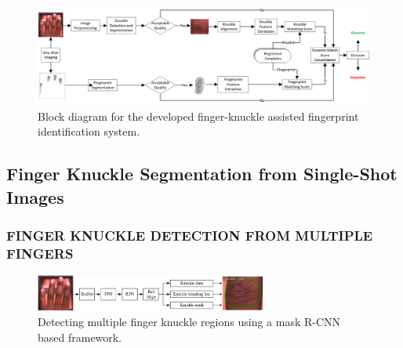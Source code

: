 \begin{figure}[!ht]
    \centering
    \includegraphics[width=6in]{Figures/block-diagram.png}
    \caption{Block diagram for the developed finger-knuckle assisted fingerprint identification system.}
    \label{block-diagram}
\end{figure}

\subsection{Finger Knuckle Segmentation from Single-Shot Images}
\subsubsection{FINGER KNUCKLE DETECTION FROM MULTIPLE FINGERS}


\begin{figure}[!ht]
    \centering
    \includegraphics[width=3in]{Figures/mask-rcnn.png}
    \caption{Detecting multiple finger knuckle regions using a mask R-CNN based framework.}
    \label{mask-rcnn}
\end{figure}


